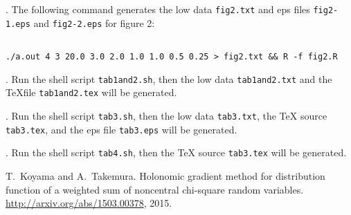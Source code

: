 \documentclass{article}
\begin{document}
\medskip{}\/.
The following command generates the low data {\tt fig2.txt}
and eps files {\tt fig2-1.eps} and {\tt fig2-2.eps} for figure 2:
\begin{lstlisting}[style=BashInputStyle]

./a.out 4 3 20.0 3.0 2.0 1.0 1.0 0.5 0.25 > fig2.txt && R -f fig2.R
\end{lstlisting}

\medskip{}\/.
Run the shell script {\tt tab1and2.sh}, then the low data {\tt tab1and2.txt} and 
the \TeX file {\tt tab1and2.tex} will be generated.

\medskip{}\/.
Run the shell script {\tt tab3.sh}, then the low data {\tt tab3.txt}, 
the TeX source {\tt tab3.tex}, and the eps file {\tt tab3.eps} will be generated.

\medskip{}\/.
Run the shell script {\tt tab4.sh}, then the TeX source {\tt tab3.tex} will be
generated.

\iftrue

\begin{thebibliography}{1}

T.~Koyama and A.~Takemura.
\newblock Holonomic gradient method for distribution function of a weighted sum
  of noncentral chi-square random variables.
\newblock \url{http://arxiv.org/abs/1503.00378}, 2015.

\end{thebibliography}

\else




\fi

\end{document}
